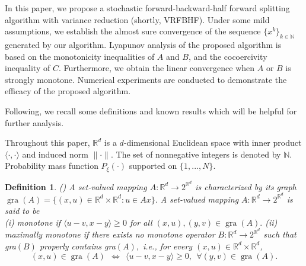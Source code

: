 \documentclass[a4paper,12pt]{article}
\newtheorem{dfn}{Definition}[section]
\theoremstyle{definition}
\DeclareMathOperator*{\gra}{gra}
\begin{document}

In this paper, we propose a stochastic forward-backward-half forward splitting algorithm with variance reduction (shortly, VRFBHF).  Under some mild assumptions, we establish the almost sure convergence of the sequence $\{x^k\}_{k \in \mathbb{N}}$ generated by our algorithm. Lyapunov analysis of the proposed algorithm is based on the monotonicity inequalities of $A$ and $B$, and the cocoercivity inequality of $C$. Furthermore, we obtain the linear convergence when $A$ or $B$ is strongly monotone. Numerical experiments are conducted to demonstrate the efficacy of the proposed algorithm.

Following, we recall some definitions and known results which will be helpful for further analysis.

Throughout this paper,  $\mathbb{R}^d$ is a $d$-dimensional Euclidean space with inner product  $\langle \cdot, \cdot\rangle$ and induced norm $\|\cdot\|$. The set of nonnegative integers is denoted by $\mathbb{N}$. Probability
mass function $P_{\xi}(\cdot)$ supported on $\{1, . . . , N\}$.

\begin{dfn}{\rm(\cite[Definition 20.1 and Definition 20.20]{BC2011})}
{\rm
 A set-valued mapping $A: \mathbb{R}^d \rightarrow 2^{\mathbb{R}^d}$ is characterized by its graph $\gra(A)=\{(x,u) \in \mathbb{R}^d\times\mathbb{R}^d:u \in Ax\}.$
A set-valued mapping $A: \mathbb{R}^d \rightarrow 2^{\mathbb{R}^d}$ is said to be\\
{\rm (i)}  monotone if $\langle u-v,x-y \rangle \geq 0$ for all $(x,u),(y,v) \in \gra(A).$\vskip 1mm
\noindent
{\rm (ii)}  maximally monotone if there exists no monotone operator $B: \mathbb{R}^d \rightarrow 2^{\mathbb{R}^d}$ such that gra$(B)$ properly contains gra$(A),$ i.e., for every $(x,u) \in \mathbb{R}^d\times \mathbb{R}^d$,
$$
(x,u) \in \gra (A)  \ \ \Leftrightarrow \ \ \langle u-v , x-y \rangle \geq 0,  \ \  \forall(y,v)\in \gra (A).
$$
}
\end{dfn}
\end{document}

